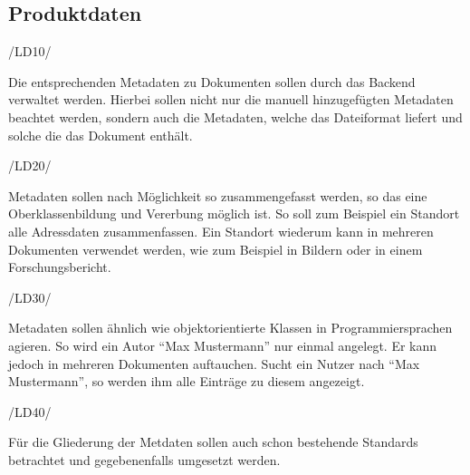 \subsection{Produktdaten} \label{Produktdaten}
\begin{minipage}{3cm}
/LD10/
\end{minipage}
\begin{minipage}{13cm}
Die entsprechenden Metadaten zu Dokumenten sollen durch das Backend verwaltet werden. Hierbei sollen nicht nur die manuell hinzugef\"ugten Metadaten beachtet werden, sondern auch die Metadaten, welche das Dateiformat liefert und solche die das Dokument enth\"alt.\\
\end{minipage}
\begin{minipage}{3cm}
/LD20/
\end{minipage}
\begin{minipage}{13cm}
Metadaten sollen nach M\"oglichkeit so zusammengefasst werden, so das eine Oberklassenbildung und Vererbung m\"oglich ist. So soll zum Beispiel ein Standort alle Adressdaten zusammenfassen. Ein Standort wiederum kann in mehreren Dokumenten verwendet werden, wie zum Beispiel in Bildern oder in einem Forschungsbericht.\\
\end{minipage}
\begin{minipage}{3cm}
/LD30/
\end{minipage}
\begin{minipage}{13cm}
Metadaten sollen \"ahnlich wie objektorientierte Klassen in Programmiersprachen agieren. So wird ein Autor "`Max Mustermann"' nur einmal angelegt. Er kann jedoch in mehreren Dokumenten auftauchen. Sucht ein Nutzer nach "`Max Mustermann"', so werden ihm alle Eintr\"age zu diesem angezeigt.\\
\end{minipage}
\begin{minipage}{3cm}
/LD40/
\end{minipage}
\begin{minipage}{13cm}
F\"ur die Gliederung der Metdaten sollen auch schon bestehende Standards betrachtet und gegebenenfalls umgesetzt werden. \cite{Wiki_Dublin_Core} \cite{Wiki_ISO_19115} \cite{Wiki_Exif} \cite{Wiki_Inspire}\\
\end{minipage}


